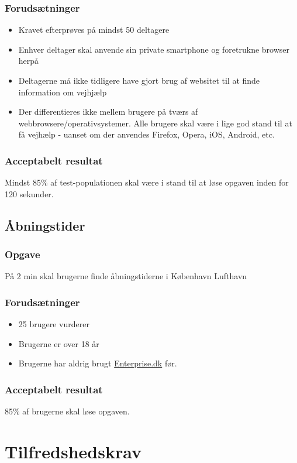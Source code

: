 \documentclass[a4paper,10pt]{article}
\begin{document}
\subsubsection{Forudsætninger}
\begin{itemize}
	\item Kravet efterprøves på mindst 50 deltagere 
	\item Enhver deltager skal anvende sin private smartphone og foretrukne browser herpå
	\item Deltagerne må ikke tidligere have gjort brug af websitet til at finde information om vejhjælp
	\item Der differentieres ikke mellem brugere på tværs af webbrowsere/operativsystemer. Alle brugere skal være i lige god stand til at få vejhælp - uanset om der anvendes Firefox, Opera, iOS, Android, etc.
\end{itemize}

\subsubsection{Acceptabelt resultat}
Mindst 85\% af test-populationen skal være i stand til at løse opgaven inden for 120 sekunder. 


\subsection{Åbningstider}
\subsubsection{Opgave}
På 2 min skal brugerne finde åbningstiderne i København Lufthavn
\subsubsection{Forudsætninger}
\begin{itemize}
	\item 25 brugere vurderer 
	\item Brugerne er over 18 år
	\item Brugerne har aldrig brugt \href{http://Enterprise.dk}{Enterprise.dk} før.
\end{itemize}
\subsubsection{Acceptabelt resultat}
85\% af brugerne skal løse opgaven.
\section{Tilfredshedskrav}
\end{document}
